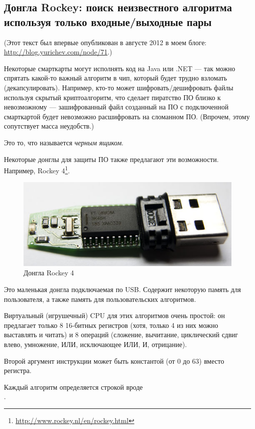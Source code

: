 ﻿\subsection{Донгла Rockey: поиск неизвестного алгоритма используя только входные/выходные пары}

(Этот текст был впервые опубликован в августе 2012 в моем блоге: \url{http://blog.yurichev.com/node/71}.)

Некоторые смарткарты могут исполнять код на Java или .NET --- так можно спрятать какой-то важный алгоритм в чип,
который будет трудно взломать (декапсулировать).
Например, кто-то может шифровать/дешифровать файлы используя скрытый криптоалгоритм, что сделает
пиратство ПО близко к невозможному --- зашифрованный файл созданный на ПО с подключенной смарткартой
будет невозможно расшифровать на сломанном ПО.
(Впрочем, этому сопутствует масса неудобств.)

Это то, что называется \textit{черным ящиком}.

Некоторые донглы для защиты ПО также предлагают эти возможности.
Например, Rockey 4\footnote{\url{http://www.rockey.nl/en/rockey.html}}.

\begin{figure}[H]
\centering
\includegraphics[scale=2]{pgm_synth/rockey_4.jpg}
\caption{Донгла Rockey 4}
\end{figure}

Это маленькая донгла подключаемая по USB. Содержит некоторую память для пользователя, а также память для пользовательских
алгоритмов.

Виртуальный (игрушечный) CPU для этих алгоритмов очень простой: он предлагает только 8 16-битных регистров
(хотя, только 4 из них можно выставлять и читать) и 8 операций
(сложение, вычитание, циклический сдвиг влево, умножение, ИЛИ, исключающее ИЛИ, И, отрицание).

Второй аргумент инструкции может быть константой (от 0 до 63) вместо регистра.

Каждый алгоритм определяется строкой вроде \\
.

